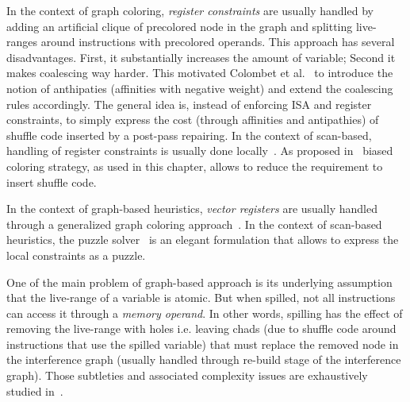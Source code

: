 {%
In the context of graph coloring, \emph{register constraints} are usually handled by adding an artificial clique of precolored node in the graph and splitting live-ranges around instructions with precolored operands.
This approach has several disadvantages.
First, it substantially increases the amount of variable;
Second it makes coalescing way harder.
This motivated Colombet et al.~\cite{ColombetOct11} to introduce the notion of anthipaties (affinities with negative weight) and extend the coalescing rules accordingly.
The general idea is, instead of enforcing ISA and register constraints, to simply express the cost (through affinities and antipathies) of shuffle code inserted by a post-pass repairing.
In the context of scan-based, handling of register constraints is usually done locally~\cite{linear-pfeifer,sarkar2007extended}.
As proposed in~\cite{braun2010preference,ColombetOct11} biased coloring strategy, as used in this chapter, allows to reduce the requirement to insert shuffle code.

In the context of graph-based heuristics, \emph{vector registers} are usually handled through a generalized graph coloring approach~\cite{Smith04,Tavares}.
In the context of scan-based heuristics, the puzzle solver~\cite{Pereira:2008:PLDI} is an elegant formulation that allows to express the local constraints as a puzzle. 

One of the main problem of graph-based approach is its underlying assumption that the live-range of a variable is atomic.
But when spilled, not all instructions can access it through a \emph{memory operand}.
In other words, spilling has the effect of removing the live-range with holes i.e. leaving chads (due to shuffle code around instructions that use the spilled variable) that must replace the removed node in the interference graph (usually handled through re-build stage of the interference graph).
Those subtleties and associated complexity issues are exhaustively studied in~\cite{Bouchez07b}. 

}
